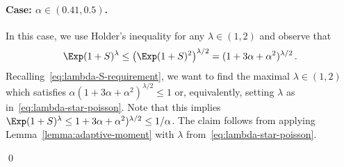         \paragraph{Case: $\alpha \in (0.41, 0.5)$.}
        In this case, we use Holder's inequality for any $\lambda \in (1,2)$ 
        and observe that 
        $$
            \Exp (1+S)^\lambda 
            \leq \left( \Exp (1+S)^2 \right)^{\lambda/2} 
            = (1 + 3\alpha +\alpha^2)^{\lambda/2}
            \,.
        $$
        Recalling~\eqref{eq:lambda-S-requirement}, 
        we want to find the maximal $\lambda \in (1, 2)$ 
        which satisfies $\alpha(1 + 3\alpha +\alpha^2)^{\lambda/2} \leq 1$ or, 
        equivalently, setting $\lambda$ as in~\eqref{eq:lambda-star-poisson}. 
        Note that this implies $\Exp (1+S)^\lambda \leq 1 + 3\alpha +\alpha^2)^{\lambda/2} \leq 1/\alpha$.
        The claim follows from applying Lemma~\ref{lemma:adaptive-moment} 
        with $\lambda$ from~\eqref{eq:lambda-star-poisson}. 


    \hfill\qed


























